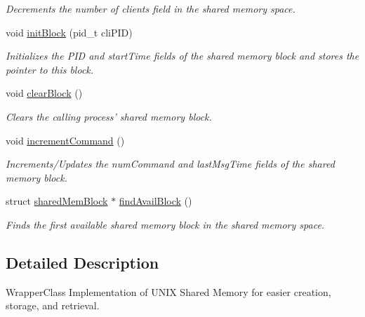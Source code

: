 \begin{DoxyCompactItemize}
\begin{DoxyCompactList}\small\item\em Decrements the number of clients field in the shared memory space. \end{DoxyCompactList}\item 
void \hyperlink{classSharedMemoryManager_ad598919ed2f1ca742b7f004587403ab8}{init\-Block} (pid\-\_\-t cli\-P\-I\-D)
\begin{DoxyCompactList}\small\item\em Initializes the P\-I\-D and start\-Time fields of the shared memory block and stores the pointer to this block. \end{DoxyCompactList}\item 
\hypertarget{classSharedMemoryManager_afc90af415f4d62609a66db29c2c185cd}{void \hyperlink{classSharedMemoryManager_afc90af415f4d62609a66db29c2c185cd}{clear\-Block} ()}\label{classSharedMemoryManager_afc90af415f4d62609a66db29c2c185cd}

\begin{DoxyCompactList}\small\item\em Clears the calling process' shared memory block. \end{DoxyCompactList}\item 
\hypertarget{classSharedMemoryManager_a7937104b69646b8c1216504d920cc417}{void \hyperlink{classSharedMemoryManager_a7937104b69646b8c1216504d920cc417}{increment\-Command} ()}\label{classSharedMemoryManager_a7937104b69646b8c1216504d920cc417}

\begin{DoxyCompactList}\small\item\em Increments/\-Updates the num\-Command and last\-Msg\-Time fields of the shared memory block. \end{DoxyCompactList}\item 
struct \hyperlink{structSharedMemoryManager_1_1sharedMemBlock}{shared\-Mem\-Block} $\ast$ \hyperlink{classSharedMemoryManager_a3ec080502acf8c32b97024ad65e83724}{find\-Avail\-Block} ()
\begin{DoxyCompactList}\small\item\em Finds the first available shared memory block in the shared memory space. \end{DoxyCompactList}\end{DoxyCompactItemize}


\subsection{Detailed Description}
Wrapper\-Class Implementation of U\-N\-I\-X Shared Memory for easier creation, storage, and retrieval. 


